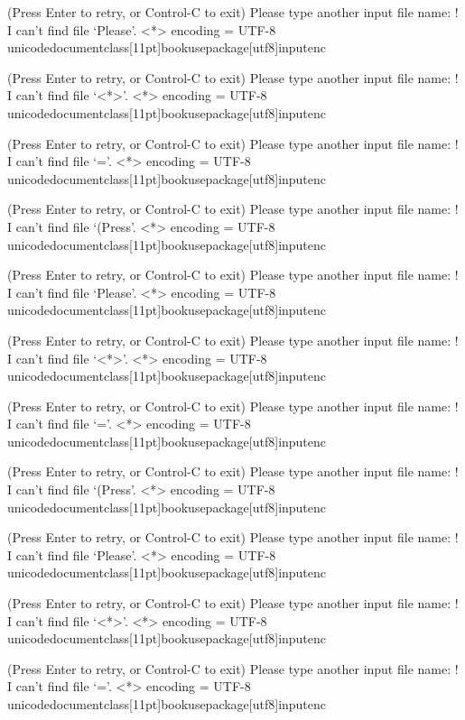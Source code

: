 (Press Enter to retry, or Control-C to exit)
Please type another input file name: ! I can't find file `Please'.
<*> encoding 
             = UTF-8 unicodedocumentclass[11pt]{book}usepackage[utf8]{inputenc}

(Press Enter to retry, or Control-C to exit)
Please type another input file name: ! I can't find file `<*>'.
<*> encoding 
             = UTF-8 unicodedocumentclass[11pt]{book}usepackage[utf8]{inputenc}

(Press Enter to retry, or Control-C to exit)
Please type another input file name: ! I can't find file `='.
<*> encoding 
             = UTF-8 unicodedocumentclass[11pt]{book}usepackage[utf8]{inputenc}

(Press Enter to retry, or Control-C to exit)
Please type another input file name: ! I can't find file `(Press'.
<*> encoding 
             = UTF-8 unicodedocumentclass[11pt]{book}usepackage[utf8]{inputenc}

(Press Enter to retry, or Control-C to exit)
Please type another input file name: ! I can't find file `Please'.
<*> encoding 
             = UTF-8 unicodedocumentclass[11pt]{book}usepackage[utf8]{inputenc}

(Press Enter to retry, or Control-C to exit)
Please type another input file name: ! I can't find file `<*>'.
<*> encoding 
             = UTF-8 unicodedocumentclass[11pt]{book}usepackage[utf8]{inputenc}

(Press Enter to retry, or Control-C to exit)
Please type another input file name: ! I can't find file `='.
<*> encoding 
             = UTF-8 unicodedocumentclass[11pt]{book}usepackage[utf8]{inputenc}

(Press Enter to retry, or Control-C to exit)
Please type another input file name: ! I can't find file `(Press'.
<*> encoding 
             = UTF-8 unicodedocumentclass[11pt]{book}usepackage[utf8]{inputenc}

(Press Enter to retry, or Control-C to exit)
Please type another input file name: ! I can't find file `Please'.
<*> encoding 
             = UTF-8 unicodedocumentclass[11pt]{book}usepackage[utf8]{inputenc}

(Press Enter to retry, or Control-C to exit)
Please type another input file name: ! I can't find file `<*>'.
<*> encoding 
             = UTF-8 unicodedocumentclass[11pt]{book}usepackage[utf8]{inputenc}

(Press Enter to retry, or Control-C to exit)
Please type another input file name: ! I can't find file `='.
<*> encoding 
             = UTF-8 unicodedocumentclass[11pt]{book}usepackage[utf8]{inputenc}

